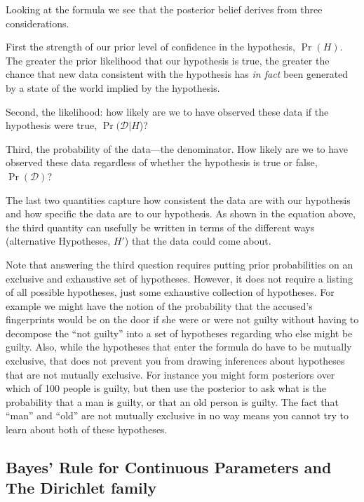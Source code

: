 \documentclass[
  12pt,
]{book}
\begin{document}
Looking at the formula we see that the posterior belief derives from three considerations.

First the strength of our prior level of confidence in the hypothesis, \(\Pr(H)\). The greater the prior likelihood that our hypothesis is true, the greater the chance that new data consistent with the hypothesis has \emph{in fact} been generated by a state of the world implied by the hypothesis.

Second, the likelihood: how likely are we to have observed these data if the hypothesis were true, \(\Pr(\mathcal{D}|H\))?

Third, the probability of the data---the denominator. How likely are we to have observed these data regardless of whether the hypothesis is true or false, \(\Pr(\mathcal{D})\)?

The last two quantities capture how consistent the data are with our hypothesis and how specific the data are to our hypothesis. As shown in the equation above, the third quantity can usefully be written in terms of the different ways (alternative Hypotheses, \(H'\)) that the data could come about.

Note that answering the third question requires putting prior probabilities on an exclusive and exhaustive set of hypotheses. However, it does not require a listing of all possible hypotheses, just some exhaustive collection of hypotheses. For example we might have the notion of the probability that the accused's fingerprints would be on the door if she were or were not guilty without having to decompose the ``not guilty'' into a set of hypotheses regarding who else might be guilty. Also, while the hypotheses that enter the formula do have to be mutually exclusive, that does not prevent you from drawing inferences about hypotheses that are not mutually exclusive. For instance you might form posteriors over which of 100 people is guilty, but then use the posterior to ask what is the probability that a man is guilty, or that an old person is guilty. The fact that ``man'' and ``old'' are not mutually exclusive in no way means you cannot try to learn about both of these hypotheses.

\hypertarget{bayes-rule-for-continuous-parameters-and-the-dirichlet-family}{%
\subsection{Bayes' Rule for Continuous Parameters and The Dirichlet family}\label{bayes-rule-for-continuous-parameters-and-the-dirichlet-family}}
\end{document}
